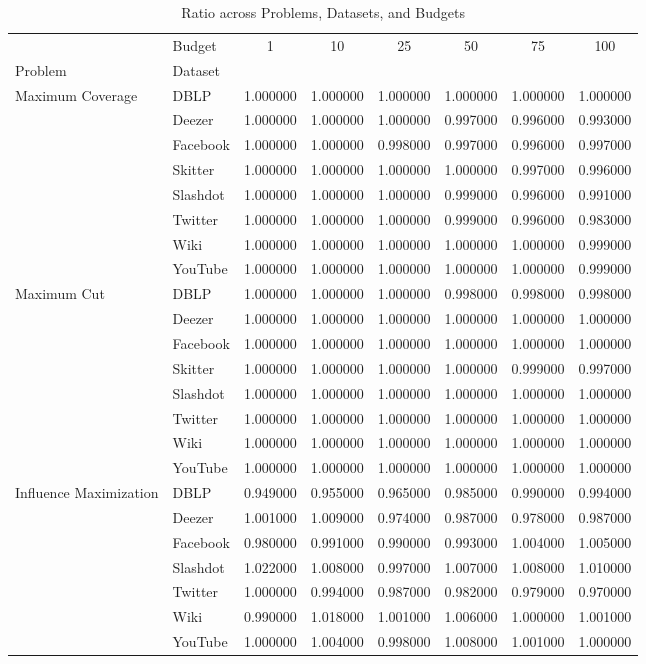 \begin{table}
\caption{Ratio across Problems, Datasets, and Budgets}
\label{tab:combined_ratio}
\begin{tabular}{llcccccc}
\toprule
 & Budget & 1 & 10 & 25 & 50 & 75 & 100 \\
Problem & Dataset &  &  &  &  &  &  \\
\midrule
\multirow[t]{8}{*}{Maximum Coverage} & DBLP & 1.000000 & 1.000000 & 1.000000 & 1.000000 & 1.000000 & 1.000000 \\
 & Deezer & 1.000000 & 1.000000 & 1.000000 & 0.997000 & 0.996000 & 0.993000 \\
 & Facebook & 1.000000 & 1.000000 & 0.998000 & 0.997000 & 0.996000 & 0.997000 \\
 & Skitter & 1.000000 & 1.000000 & 1.000000 & 1.000000 & 0.997000 & 0.996000 \\
 & Slashdot & 1.000000 & 1.000000 & 1.000000 & 0.999000 & 0.996000 & 0.991000 \\
 & Twitter & 1.000000 & 1.000000 & 1.000000 & 0.999000 & 0.996000 & 0.983000 \\
 & Wiki & 1.000000 & 1.000000 & 1.000000 & 1.000000 & 1.000000 & 0.999000 \\
 & YouTube & 1.000000 & 1.000000 & 1.000000 & 1.000000 & 1.000000 & 0.999000 \\
\cline{1-8}
\multirow[t]{8}{*}{Maximum Cut} & DBLP & 1.000000 & 1.000000 & 1.000000 & 0.998000 & 0.998000 & 0.998000 \\
 & Deezer & 1.000000 & 1.000000 & 1.000000 & 1.000000 & 1.000000 & 1.000000 \\
 & Facebook & 1.000000 & 1.000000 & 1.000000 & 1.000000 & 1.000000 & 1.000000 \\
 & Skitter & 1.000000 & 1.000000 & 1.000000 & 1.000000 & 0.999000 & 0.997000 \\
 & Slashdot & 1.000000 & 1.000000 & 1.000000 & 1.000000 & 1.000000 & 1.000000 \\
 & Twitter & 1.000000 & 1.000000 & 1.000000 & 1.000000 & 1.000000 & 1.000000 \\
 & Wiki & 1.000000 & 1.000000 & 1.000000 & 1.000000 & 1.000000 & 1.000000 \\
 & YouTube & 1.000000 & 1.000000 & 1.000000 & 1.000000 & 1.000000 & 1.000000 \\
\cline{1-8}
\multirow[t]{7}{*}{Influence Maximization} & DBLP & 0.949000 & 0.955000 & 0.965000 & 0.985000 & 0.990000 & 0.994000 \\
 & Deezer & 1.001000 & 1.009000 & 0.974000 & 0.987000 & 0.978000 & 0.987000 \\
 & Facebook & 0.980000 & 0.991000 & 0.990000 & 0.993000 & 1.004000 & 1.005000 \\
 & Slashdot & 1.022000 & 1.008000 & 0.997000 & 1.007000 & 1.008000 & 1.010000 \\
 & Twitter & 1.000000 & 0.994000 & 0.987000 & 0.982000 & 0.979000 & 0.970000 \\
 & Wiki & 0.990000 & 1.018000 & 1.001000 & 1.006000 & 1.000000 & 1.001000 \\
 & YouTube & 1.000000 & 1.004000 & 0.998000 & 1.008000 & 1.001000 & 1.000000 \\
\cline{1-8}
\bottomrule
\end{tabular}
\end{table}
